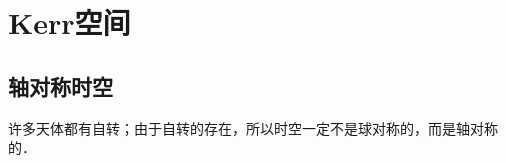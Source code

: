 
\chapter{Kerr空间}\label{chkerr}



\section{轴对称时空}\label{chkerr:sec_axis-sym}

许多天体都有自转；由于自转的存在，所以时空一定不是球对称的，而是轴对称的．



